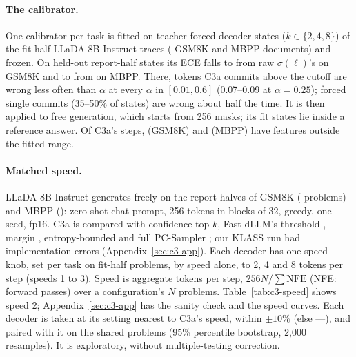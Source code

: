 \paragraph{The calibrator.}
One calibrator per task is fitted on teacher-forced decoder states ($k\in\{2,4,8\}$) of the
fit-half LLaDA-8B-Instruct traces ( GSM8K and
 MBPP documents) and frozen. On held-out report-half states its ECE falls to  from
raw $\sigma(\ell)$'s  on GSM8K and to  from
 on MBPP.
There, tokens C3a commits above the cutoff are wrong less often than $\alpha$ at every $\alpha$ in
$[0.01,0.6]$ (0.07--0.09 at $\alpha=0.25$); forced single commits (35--50\% of states) are wrong
about half the time.
It is then applied to free generation, which starts
from 256 masks; its fit states lie inside a reference answer. Of C3a's steps,  (GSM8K) and
 (MBPP) have features outside the fitted range.

\paragraph{Matched speed.}
LLaDA-8B-Instruct generates freely on the report halves of GSM8K
( problems) and MBPP (): zero-shot chat prompt,
256 tokens in blocks of 32, greedy, one seed, fp16.
C3a is compared with confidence top-$k$, Fast-dLLM's threshold \citep{wu2025fastdllm},
margin \citep{kim2025worst}, entropy-bounded \citep{benhamu2025entropy} and full PC-Sampler
\citep{huang2025pcsampler}; our KLASS \citep{kim2025klass} run had implementation errors
(Appendix~\ref{sec:c3-app}).
Each decoder has one speed knob, set per task on fit-half problems, by speed alone, to 2, 4 and
8 tokens per step (speeds 1 to 3). Speed is aggregate tokens per step, $256N/\sum\mathrm{NFE}$ (NFE: forward passes) over
a configuration's $N$ problems. Table~\ref{tab:c3-speed} shows speed 2; Appendix~\ref{sec:c3-app}
has the sanity check and the speed curves. Each decoder is
taken at its setting nearest to C3a's speed, within $\pm10\%$ (else ---), and paired with it
on the shared problems (95\% percentile bootstrap,
2,000 resamples). It is exploratory, without multiple-testing correction.

